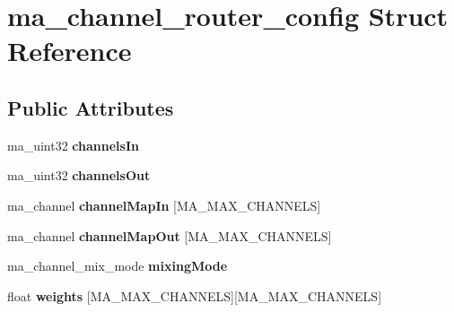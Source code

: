 \hypertarget{structma__channel__router__config}{}\section{ma\+\_\+channel\+\_\+router\+\_\+config Struct Reference}
\label{structma__channel__router__config}
\subsection*{Public Attributes}
\begin{DoxyCompactItemize}
\item 
\mbox{\label{structma__channel__router__config_aaf4c279bc5060b1616c41743850ec608}} 
ma\+\_\+uint32 {\bfseries channels\+In}
\item 
\mbox{\label{structma__channel__router__config_acf76d3d8beabae5b2793afb9762bc8b9}} 
ma\+\_\+uint32 {\bfseries channels\+Out}
\item 
\mbox{\label{structma__channel__router__config_a08d314e2c65d9153793ce332f85dd5ff}} 
ma\+\_\+channel {\bfseries channel\+Map\+In} \mbox{[}M\+A\+\_\+\+M\+A\+X\+\_\+\+C\+H\+A\+N\+N\+E\+LS\mbox{]}
\item 
\mbox{\label{structma__channel__router__config_afaf26d336b21201cbbcb1d023db5ab8a}} 
ma\+\_\+channel {\bfseries channel\+Map\+Out} \mbox{[}M\+A\+\_\+\+M\+A\+X\+\_\+\+C\+H\+A\+N\+N\+E\+LS\mbox{]}
\item 
\mbox{\label{structma__channel__router__config_a0ca4991777843dec9f890f97cbdcc586}} 
ma\+\_\+channel\+\_\+mix\+\_\+mode {\bfseries mixing\+Mode}
\item 
\mbox{\label{structma__channel__router__config_a75217c640ab733a70af3e7c802056119}} 
float {\bfseries weights} \mbox{[}M\+A\+\_\+\+M\+A\+X\+\_\+\+C\+H\+A\+N\+N\+E\+LS\mbox{]}\mbox{[}M\+A\+\_\+\+M\+A\+X\+\_\+\+C\+H\+A\+N\+N\+E\+LS\mbox{]}
\item 
\mbox{\label{structma__channel__router__config_ad1e7ee4ab49a1598139ce1d589b5dd43}} 

\end{DoxyCompactItemize}

